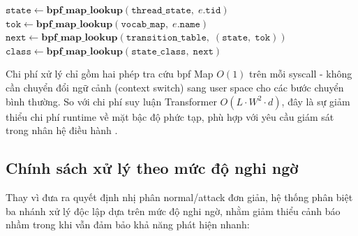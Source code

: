 \documentclass[../main.tex]{subfiles}
\begin{document}
\begin{algorithm}[H]
  \caption{Trình xử lý eBPF: xử lý mỗi sự kiện syscall}
  \label{alg:ebpf_handler}
  \SetAlgoLined
  \DontPrintSemicolon
  \BlankLine
  $\mathtt{state} \gets \mathbf{bpf\_map\_lookup}(\mathtt{thread\_state},\;
  e.\mathtt{tid})$\;
  \BlankLine
  $\mathtt{tok} \gets \mathbf{bpf\_map\_lookup}(\mathtt{vocab\_map},\;
  e.\mathtt{name})$\;
  \BlankLine
  $\mathtt{next} \gets \mathbf{bpf\_map\_lookup}(\mathtt{transition\_table},\;
  (\mathtt{state},\; \mathtt{tok}))$\;
  \BlankLine
  $\mathtt{class} \gets \mathbf{bpf\_map\_lookup}(\mathtt{state\_class},\;
  \mathtt{next})$\;
\end{algorithm}

Chi phí xử lý chỉ gồm hai phép tra cứu \gls{bpf} Map $O(1)$ trên mỗi
\gls{syscall} - không cần
chuyển đổi ngữ cảnh (context switch) sang user space cho các bước
chuyển bình thường.
So với chi phí suy luận Transformer $O(L \cdot W^2 \cdot d)$, đây là
sự giảm thiểu chi
phí runtime về mặt bậc độ phức tạp, phù hợp với yêu cầu giám sát
trong nhân hệ điều
hành \cite{zhang2024realtime,her2025indepth}.

\subsection{Chính sách xử lý theo mức độ nghi ngờ}
\label{sec:categorical_response}

Thay vì đưa ra quyết định nhị phân normal/attack đơn giản, hệ thống
phân biệt ba nhánh
xử lý độc lập dựa trên mức độ nghi ngờ, nhằm giảm thiểu cảnh báo nhầm
trong khi vẫn
đảm bảo khả năng phát hiện nhanh:
\end{document}
